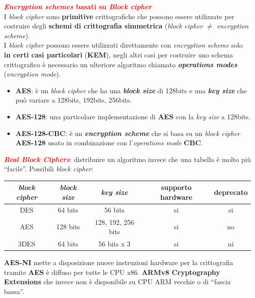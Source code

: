 \begin{flushleft}
    \textcolor{red}{\textbf{\textit{Encryption schemes} basati su \textit{Block cipher}}} \\
    I \textit{block cipher} sono \textbf{primitive} crittografiche che possono essere utilizzate per costruire degli \textbf{schemi di crittografia simmetrica} (\textit{block cipher $\neq$ encryption scheme}). \\
    I \textit{block cipher} possono essere utilizzati direttamente con \textit{encryption scheme} solo \textbf{in certi casi particolari} (\textbf{KEM}), negli altri casi per costruire uno schema crittografico è necessario un ulteriore algoritmo chiamato \textbf{\textit{operations modes}} (\textit{encryption mode}).
    \begin{itemize}[nosep]
        \item \textbf{AES}: è un \textit{block cipher} che ha una \textbf{\textit{block size}} di 128bits e una \textbf{\textit{key size}} che può variare a 128bits, 192bits, 256bits.
        \item \textbf{AES-128}: una particolare implementazione di \textbf{AES} con la \textit{key size} a 128bits.
        \item \textbf{AES-128-CBC}: è un \textbf{\textit{encryption scheme}} che si basa su un \textit{block cipher} \textbf{AES-128} usato in combinazione con l'\textit{operations mode} \textbf{CBC}.
    \end{itemize}

    \textcolor{red}{\textbf{\textit{Real Block Ciphers}}}: distribuire un algoritmo invece che una tabella è molto più ``facile''. Possibili \textit{block cipher}:

    \begin{center}
        \begin{tabular}{|c|c|c|c|c|} \hline
            \textbf{\textit{block cipher}} & \textbf{\textit{block size}} & \textbf{\textit{key size}} & \textbf{supporto hardware} & \textbf{deprecato} \\ \hline
            DES & 64 bits & 56 bits & si & si \\ \hline
            AES & 128 bits & 128, 192, 256 bits & si & no \\ \hline
            3DES & 64 bits & 56 bits x 3 & si & ni \\ \hline
        \end{tabular}
    \end{center}
    \textbf{AES-NI} mette a disposizione nuove instruzioni hardware per la crittografia tramite \textbf{AES} è diffuso per tutte le CPU x86. \textbf{ARMv8 Cryptography Extensions} che invece non è disponibile su CPU ARM vecchie o di ``fascia bassa''. \\


\end{flushleft}
